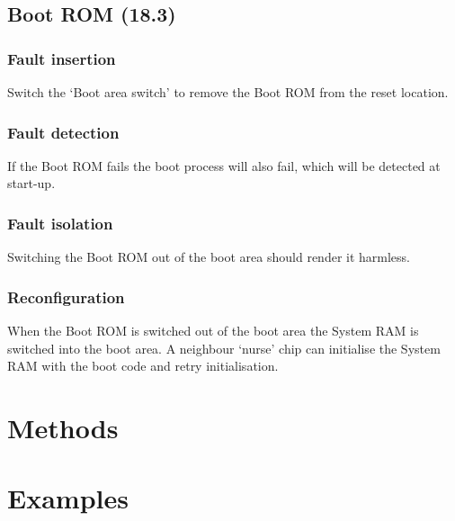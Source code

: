 \documentclass[11pt]{article}
\begin{document}
\subsection{Boot ROM (18.3)}
\subsubsection*{Fault insertion}
Switch the `Boot area switch' to remove the Boot ROM from the reset location.
\subsubsection*{Fault detection}
If the Boot ROM fails the boot process will also fail, which will be detected at start-up.
\subsubsection*{Fault isolation}
Switching the Boot ROM out of the boot area should render it harmless.
\subsubsection*{Reconfiguration}
When the Boot ROM is switched out of the boot area the System RAM is switched into the boot
area. A neighbour `nurse' chip can initialise the System RAM with the boot code and retry
initialisation.

\section{Methods}

\section{Examples}
\end{document}
